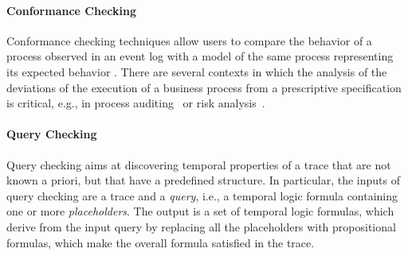 \paragraph{Conformance Checking}  Conformance checking techniques allow users to compare the behavior of a process observed in an event log with a model of the same process representing its expected behavior \cite{wires-replay,costBasedReplayEDOC,anne_confcheck_is}. There are several contexts in which the analysis of the deviations of the execution of a business process from a prescriptive specification is critical, e.g., in process auditing~\cite{auditing} or risk analysis~\cite{riskAnalysis}.


\paragraph{Query Checking}
Query checking \cite{DBLP:conf/otm/RaimCMMM14} aims at discovering temporal properties of a trace that are not known a priori, but that have a predefined structure. In particular, the inputs of query checking are a trace and a \textit{query}, i.e., a temporal logic formula containing one or more \emph{placeholders}. The output is a set of temporal logic formulas, which derive from the input query by replacing all the placeholders with propositional formulas, which make the overall formula satisfied in the trace.

